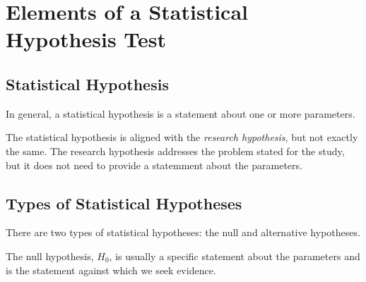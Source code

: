 \documentclass[
  letterpaper,
  DIV=11,
  numbers=noendperiod]{scrartcl}
\begin{document}
\section{Elements of a Statistical Hypothesis
Test}\label{elements-of-a-statistical-hypothesis-test}

\subsection{Statistical Hypothesis}\label{statistical-hypothesis}

In general, a statistical hypothesis is a statement about one or more
parameters.

\begin{tcolorbox}[enhanced jigsaw, bottomtitle=1mm, colback=white, opacityback=0, leftrule=.75mm, opacitybacktitle=0.6, coltitle=black, left=2mm, colframe=quarto-callout-warning-color-frame, toptitle=1mm, colbacktitle=quarto-callout-warning-color!10!white, titlerule=0mm, title=\textcolor{quarto-callout-warning-color}{\faExclamationTriangle}\hspace{0.5em}{Warning}, arc=.35mm, rightrule=.15mm, breakable, bottomrule=.15mm, toprule=.15mm]

The statistical hypothesis is aligned with the \emph{research
hypothesis}, but not exactly the same. The research hypothesis addresses
the problem stated for the study, but it does not need to provide a
statemment about the parameters.

\end{tcolorbox}

\subsection{Types of Statistical
Hypotheses}\label{types-of-statistical-hypotheses}

There are two types of statistical hypotheses: the null and alternative
hypotheses.

\begin{tcolorbox}[enhanced jigsaw, bottomtitle=1mm, colback=white, opacityback=0, leftrule=.75mm, opacitybacktitle=0.6, coltitle=black, left=2mm, colframe=quarto-callout-note-color-frame, toptitle=1mm, colbacktitle=quarto-callout-note-color!10!white, titlerule=0mm, title=\textcolor{quarto-callout-note-color}{\faInfo}\hspace{0.5em}{Null Hypothesis}, arc=.35mm, rightrule=.15mm, breakable, bottomrule=.15mm, toprule=.15mm]

The null hypothesis, \(H_0\), is usually a specific statement about the
parameters and is the statement against which we seek evidence.

\end{tcolorbox}
\end{document}
